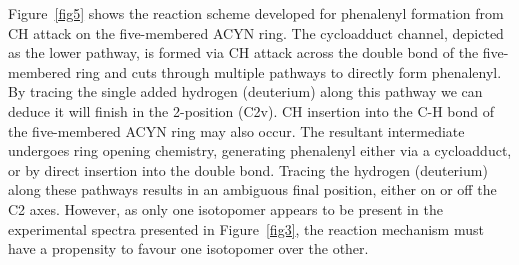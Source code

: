 \documentclass[journal=jacsat,manuscript=article,layout=onecolumn]{achemso}
\begin{document}
Figure~\ref{fig5} shows the reaction scheme developed for phenalenyl formation from CH attack on the five-membered ACYN ring. The cycloadduct channel, depicted as the lower pathway, is formed via CH attack across the double bond of the five-membered ring and cuts through multiple pathways to directly form phenalenyl. By tracing the single added hydrogen (deuterium) along this pathway we can deduce it will finish in the 2-position (C2v). CH insertion into the C-H bond of the five-membered ACYN ring may also occur. The resultant intermediate undergoes ring opening chemistry, generating phenalenyl either via a cycloadduct, or by direct insertion into the double bond. Tracing the hydrogen (deuterium) along these pathways results in an ambiguous final position, either on or off the C2 axes. However, as only one isotopomer appears to be present in the experimental spectra presented in Figure~\ref{fig3}, the reaction mechanism must have a propensity to favour one isotopomer over the other. 



\end{document}
